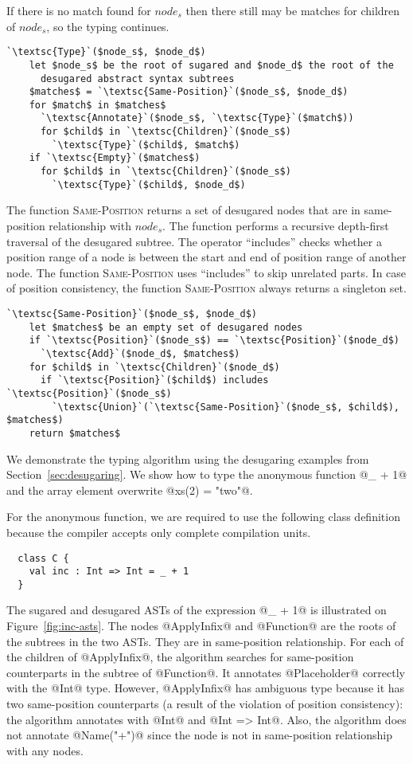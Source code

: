 \documentclass[11pt]{amsart}
\begin{document}
If there is no match found for $node_s$ then there still may be
matches for children of $node_s$, so the typing continues.
\begin{lstlisting}[mathescape=true,escapechar=\`,deletekeywords={with,abstract}]
  `\textsc{Type}`($node_s$, $node_d$)
    let $node_s$ be the root of sugared and $node_d$ the root of the
      desugared abstract syntax subtrees
    $matches$ = `\textsc{Same-Position}`($node_s$, $node_d$)
    for $match$ in $matches$
      `\textsc{Annotate}`($node_s$, `\textsc{Type}`($match$))
      for $child$ in `\textsc{Children}`($node_s$)
        `\textsc{Type}`($child$, $match$)
    if `\textsc{Empty}`($matches$)
      for $child$ in `\textsc{Children}`($node_s$)
        `\textsc{Type}`($child$, $node_d$)
\end{lstlisting}

The function \textsc{Same-Position} returns a set of desugared nodes
that are in same-position relationship with $node_s$. The function
performs a recursive depth-first traversal of the desugared
subtree. The operator ``includes'' checks whether a position range of
a node is between the start and end of position range of another node.
The function \textsc{Same-Position} uses ``includes'' to skip
unrelated parts. In case of position consistency, the function
\textsc{Same-Position} always returns a singleton set.
\begin{lstlisting}[mathescape=true,escapechar=\`,deletekeywords={with,abstract}]
  `\textsc{Same-Position}`($node_s$, $node_d$)
    let $matches$ be an empty set of desugared nodes
    if `\textsc{Position}`($node_s$) == `\textsc{Position}`($node_d$)
      `\textsc{Add}`($node_d$, $matches$)
    for $child$ in `\textsc{Children}`($node_d$)
      if `\textsc{Position}`($child$) includes `\textsc{Position}`($node_s$)
        `\textsc{Union}`(`\textsc{Same-Position}`($node_s$, $child$), $matches$)
    return $matches$
\end{lstlisting}

We demonstrate the typing algorithm using the desugaring examples from
Section~\ref{sec:desugaring}. We show how to type the anonymous
function @_ + 1@ and the array element overwrite @xs(2) = "two"@.

For the anonymous function, we are required to use the following class
definition because the compiler accepts only complete compilation
units.
\begin{lstlisting}
  class C {
    val inc : Int => Int = _ + 1
  }
\end{lstlisting}
The sugared and desugared ASTs of the expression @_ + 1@ is
illustrated on Figure~\ref{fig:inc-asts}. The nodes @ApplyInfix@ and
@Function@ are the roots of the subtrees in the two ASTs. They are in
same-position relationship. For each of the children of @ApplyInfix@,
the algorithm searches for same-position counterparts in the subtree
of @Function@. It annotates @Placeholder@ correctly with the @Int@
type. However, @ApplyInfix@ has ambiguous type because it has two
same-position counterparts (a result of the violation of position
consistency): the algorithm annotates with @Int@ and @Int => Int@.
Also, the algorithm does not annotate @Name("+")@ since the node is
not in same-position relationship with any nodes.
\end{document}
